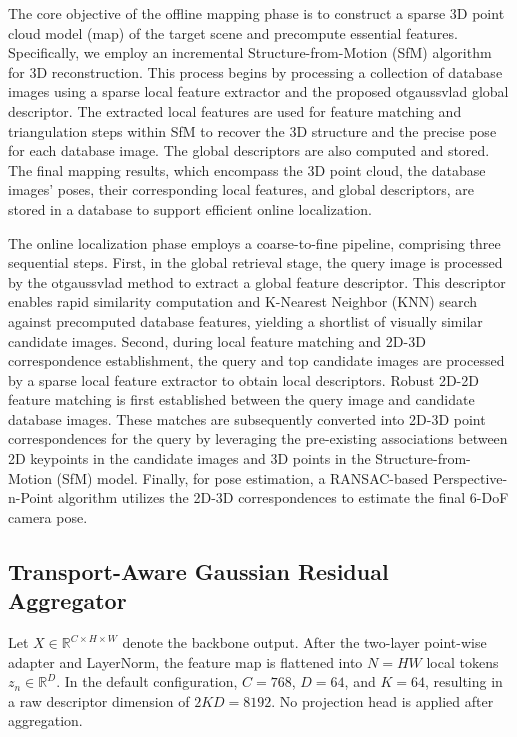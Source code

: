 \documentclass[journal]{IEEEtran}
\begin{document}
The core objective of the offline mapping phase is to construct a sparse 3D point cloud model (map) of the target scene and precompute essential features. Specifically, we employ an incremental Structure-from-Motion (SfM) algorithm for 3D reconstruction. This process begins by processing a collection of database images using a sparse local feature extractor and the proposed otgaussvlad global descriptor. The extracted local features are used for feature matching and triangulation steps within SfM to recover the 3D structure and the precise pose for each database image. The global descriptors are also computed and stored. The final mapping results, which encompass the 3D point cloud, the database images' poses, their corresponding local features, and global descriptors, are stored in a database to support efficient online localization.

The online localization phase employs a coarse-to-fine pipeline, comprising three sequential steps. First, in the global retrieval stage, the query image is processed by the otgaussvlad method to extract a global feature descriptor. This descriptor enables rapid similarity computation and K-Nearest Neighbor (KNN) search against precomputed database features, yielding a shortlist of visually similar candidate images. Second, during local feature matching and 2D-3D correspondence establishment, the query and top candidate images are processed by a sparse local feature extractor to obtain local descriptors. Robust 2D-2D feature matching is first established between the query image and candidate database images. These matches are subsequently converted into 2D-3D point correspondences for the query by leveraging the pre-existing associations between 2D keypoints in the candidate images and 3D points in the Structure-from-Motion (SfM) model. Finally, for pose estimation, a RANSAC-based Perspective-n-Point algorithm utilizes the 2D-3D correspondences to estimate the final 6-DoF camera pose. 



\subsection{Transport-Aware Gaussian Residual Aggregator}
Let \(X \in \mathbb{R}^{C \times H \times W}\) denote the backbone output. After the two-layer point-wise adapter and LayerNorm, the feature map is flattened into \(N = HW\) local tokens \(z_n \in \mathbb{R}^D\). In the default configuration, \(C = 768\), \(D = 64\), and \(K = 64\), resulting in a raw descriptor dimension of \(2KD = 8192\). No projection head is applied after aggregation.
\end{document}
